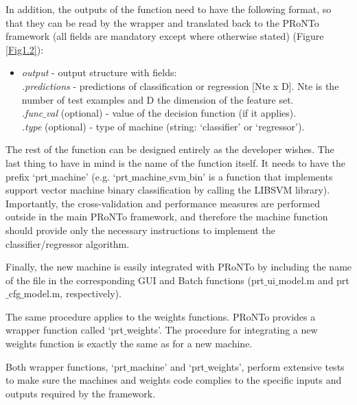 In addition, the outputs of the function need to have the following format, so that they can be read by the wrapper and translated back to the PRoNTo framework (all fields are mandatory except where otherwise stated) (Figure \ref{Fig1.2}):

\begin{itemize}
\item \textit{output}  - output structure with fields:\\
\textit{.predictions} - predictions of classification or regression [Nte x D]. Nte is the number of test examples and D the dimension of the feature set.\\
\textit{.func$\_$val} (optional) - value of the decision function (if it applies).\\
\textit{.type}  (optional) - type of machine (string: `classifier' or `regressor').
\end{itemize}

The rest of the function can be designed entirely as the developer wishes. The last thing to have in mind is the name of the function itself. It needs to have the prefix `prt$\_$machine' (e.g. `prt$\_$machine$\_$svm$\_$bin' is a function that implements support vector machine binary classification by calling the LIBSVM library). Importantly, the cross-validation and performance measures are performed outside in the main PRoNTo framework, and therefore the machine function should provide only the necessary instructions to implement the classifier/regressor algorithm.

Finally, the new machine is easily integrated with PRoNTo by including the name of the file in the corresponding GUI and Batch functions (prt$\_$ui$\_$model.m and prt$\_$cfg$\_$model.m, respectively).

The same procedure applies to the weights functions. PRoNTo provides a wrapper function called `prt$\_$weights'. The procedure for integrating a new weights function is exactly the same as for a new machine.

Both wrapper functions, `prt$\_$machine' and  `prt$\_$weights', perform extensive tests to make sure the machines and weights code complies to the specific inputs and outputs required by the framework. 







